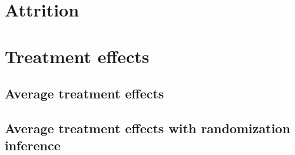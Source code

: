 \documentclass[10pt]{article}
\begin{document}
	\clearpage

\section{Attrition}

	

	
	
	
	
	

	
	
	
	

	\clearpage

\section{Treatment effects}

	\subsection{Average treatment effects}

		
		
		
		
		
		
		

	\clearpage


    \subsection{Average treatment effects with randomization inference}
\end{document}
